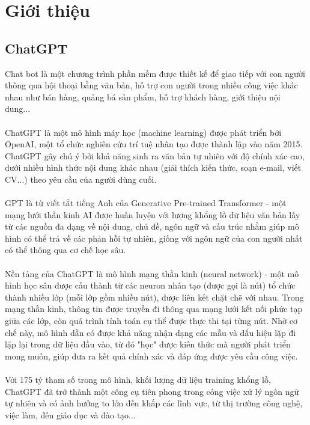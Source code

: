 \documentclass[a4paper, 12pt]{article}
\begin{document}
	\section{Giới thiệu}
		\subsection{ChatGPT}
			Chat bot là một chương trình phần mềm được thiết kế để giao tiếp với con người thông qua hội thoại bằng văn bản, hỗ trợ con người trong nhiều công việc khác nhau như bán hàng, quảng bá sản phẩm, hỗ trợ khách hàng, giới thiệu nội dung...
			\\
			\\
			ChatGPT là một mô hình máy học (machine learning) được phát triển bởi OpenAI, một tổ chức nghiên cứu trí tuệ nhân tạo được thành lập vào năm 2015. ChatGPT gây chú ý bởi khả năng sinh ra văn bản tự nhiên với độ chính xác cao, dưới nhiều hình thức nội dung khác nhau (giải thích kiến thức, soạn e-mail, viết CV...) theo yêu cầu của người dùng cuối. 
			\\
			\\
			GPT là từ viết tắt tiếng Anh của Generative Pre-trained Transformer - một mạng lưới thần kinh AI được huấn luyện với lượng khổng lồ dữ liệu văn bản lấy từ các nguồn đa dạng về nội dung, chủ đề, ngôn ngữ và cấu trúc nhằm giúp mô hình có thể trả về các phản hồi tự nhiên, giống với ngôn ngữ của con người nhất có thể thông qua cơ chế học sâu.
			\\
			\\
			Nền tảng của ChatGPT là mô hình mạng thần kinh (neural network) - một mô hình học sâu được cấu thành từ các neuron nhân tạo (được gọi là nút) tổ chức thành nhiều lớp (mỗi lớp gồm nhiều nút), được liên kết chặt chẽ với nhau. Trong mạng thần kinh, thông tin được truyền đi thông qua mạng lưới kết nối phức tạp giữa các lớp, còn quá trình tính toán cụ thể được thực thi tại từng nút. Nhờ cơ chế này, mô hình dần có được khả năng nhận dạng các mẫu và dấu hiệu lặp đi lặp lại trong dữ liệu đầu vào, từ đó "học" được kiến thức mà người phát triển mong muốn, giúp đưa ra kết quả chính xác và đáp ứng được yêu cầu công việc.
			\\
			\\
			Với 175 tỷ tham số trong mô hình, khối lượng dữ liệu training khổng lồ, ChatGPT đã trở thành một công cụ tiên phong trong công việc xử lý ngôn ngữ tự nhiên và có ảnh hưởng to lớn đến khắp các lĩnh  vực, từ thị trường công nghệ, việc làm, đến giáo dục và đào tạo...
			
\end{document}
